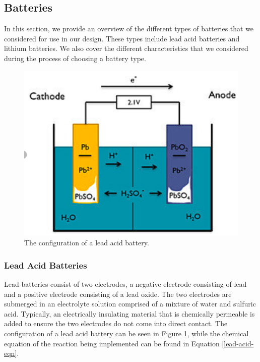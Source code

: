 \subsection{Batteries}
In this section, we provide an overview of the different types of batteries that we considered for use in our design. These types include lead acid batteries and lithium batteries. We also cover the different characteristics that we considered during the process of choosing a battery type.

\begin{figure}
    \centering
    \includegraphics[scale=0.25]{figures/lead-acid-battery.png}
    \caption{The configuration of a lead acid battery.}
    \label{lead-acid-battery} 
\end{figure}

\subsubsection{Lead Acid Batteries}
Lead batteries consist of two electrodes, a negative electrode consisting of lead and a positive electrode consisting of a lead oxide. The two electrodes are submerged in an electrolyte solution comprised of a mixture of water and sulfuric acid. Typically, an electrically insulating material that is chemically permeable is added to ensure the two electrodes do not come into direct contact. The configuration of a lead acid battery can be seen in Figure \ref{lead-acid-battery}, while the chemical equation of the reaction being implemented can be found in Equation \ref{lead-acid-eqn}.

